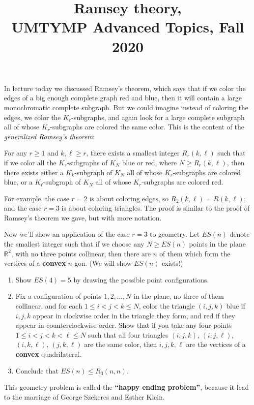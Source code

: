 \documentclass[11pt]{article}
\title{Ramsey theory, \\ UMTYMP Advanced Topics, Fall 2020}
\date{}
\begin{document}
\maketitle

\vspace{-0.5in}

\thispagestyle{empty}

In lecture today we discussed Ramsey's theorem, which says that if we color the edges of a big enough complete graph red and blue, then it will contain a large monochromatic complete subgraph. But we could imagine instead of coloring the edges, we color the $K_r$-subgraphs, and again look for a large complete subgraph all of whose $K_r$-subgraphs are colored the same color. This is the content of the \emph{generalized Ramsey's theorem}:

\medskip

 For any $r\geq 1$ and $k,\ell\geq r$, there exists a smallest integer $R_r(k,\ell)$ such that if we color all the $K_r$-subgraphs of $K_N$ blue or red, where $N \geq R_r(k,\ell)$, then there exists either a $K_k$-subgraph of $K_N$ all of whose $K_r$-subgraphs are colored blue, or a $K_{\ell}$-subgraph of $K_N$ all of whose $K_r$-subgraphs are colored red.

\medskip

For example, the case $r=2$ is about coloring edges, so $R_2(k,\ell)=R(k,\ell)$; and the case $r=3$ is about coloring triangles. The proof is similar to the proof of Ramsey's theorem we gave, but with more notation. 

\medskip

Now we'll show an application of the case $r=3$ to geometry. Let $ES(n)$ denote the smallest integer such that if we choose any $N \geq ES(n)$ points in the plane $\mathbb{R}^2$, with no three points collinear, then there are $n$ of them which form the vertices of a {\bf convex} $n$-gon. (We will show $ES(n)$ exists!)

\begin{enumerate}
\item Show $ES(4)=5$ by drawing the possible point configurations.
\item Fix a configuration of points $1,2,\ldots,N$ in the plane, no three of them collinear, and for each $1 \leq i < j < k \leq N$, color the triangle $(i,j,k)$ blue if $i,j,k$ appear in clockwise order in the triangle they form, and red if they appear in counterclockwise order. Show that if you take any four points $1 \leq i < j < k < \ell \leq N$ such that all four triangles $(i,j,k)$, $(i,j,\ell)$, $(i,k,\ell)$, $(j,k,\ell)$ are the same color, then $i,j,k,\ell$ are the vertices of a {\bf convex} quadrilateral.
\item Conclude that $ES(n) \leq R_3(n,n)$.
\end{enumerate}

\medskip

This geometry problem is called the {\bf ``happy ending problem''}, because it lead to the marriage of George Szekeres and Esther Klein.
\end{document}
